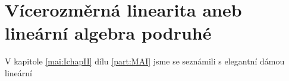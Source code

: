 \chapter{Vícerozměrná linearita aneb lineární algebra podruhé}\label{mai:IIchapI}
\minitoc
  V kapitole \ref{mai:IchapII} dílu \ref{part:MAI} jsme se seznámili s elegantní dámou lineární 

\printbibliography[title={Seznam literatury}, heading=subbibliography]
